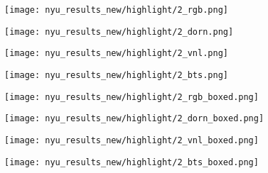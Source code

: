 \documentclass[10pt,twocolumn,letterpaper]{article}
\begin{document}
\begin{figure*}
	\centering
	\begin{subfigure}{.18\linewidth}
		\centering
		\texttt{[image: nyu\_results\_new/highlight/2\_rgb.png]}
	\end{subfigure}
	\hspace{1em}
	\begin{subfigure}{.18\linewidth}
		\centering
		\texttt{[image: nyu\_results\_new/highlight/2\_dorn.png]}
	\end{subfigure}
	\hspace{1em}
	\begin{subfigure}{.18\linewidth}
		\centering
		\texttt{[image: nyu\_results\_new/highlight/2\_vnl.png]}
	\end{subfigure}
	\hspace{1em}
	\begin{subfigure}{.18\linewidth}
		\centering
		\texttt{[image: nyu\_results\_new/highlight/2\_bts.png]}
	\end{subfigure}
	
	\begin{subfigure}{.18\linewidth}
		\centering
		\texttt{[image: nyu\_results\_new/highlight/2\_rgb\_boxed.png]}
	\end{subfigure}
	\hspace{1em}
	\begin{subfigure}{.18\linewidth}
		\centering
		\texttt{[image: nyu\_results\_new/highlight/2\_dorn\_boxed.png]}
	\end{subfigure}
	\hspace{1em}
	\begin{subfigure}{.18\linewidth}
		\centering
		\texttt{[image: nyu\_results\_new/highlight/2\_vnl\_boxed.png]}
	\end{subfigure}
	\hspace{1em}
	\begin{subfigure}{.18\linewidth}
		\centering
		\texttt{[image: nyu\_results\_new/highlight/2\_bts\_boxed.png]}
	\end{subfigure}
	\vspace{0.15cm}
	

\end{figure*}
\end{document}
